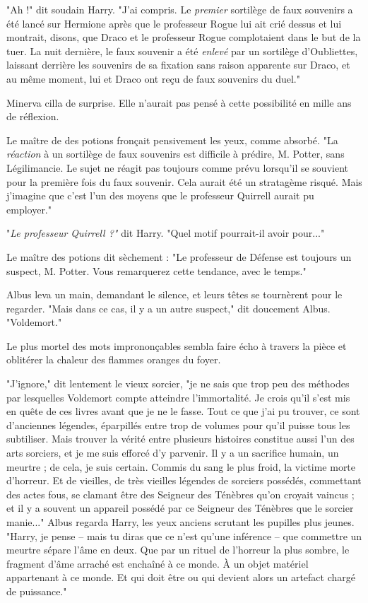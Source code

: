 "Ah !" dit soudain Harry. "J'ai compris. Le \emph{premier}  sortilège de faux souvenirs a été lancé sur Hermione après que le professeur Rogue lui ait crié dessus et lui montrait, disons, que Draco et le professeur Rogue complotaient dans le but de la tuer. La nuit dernière, le faux souvenir a été \emph{enlevé}  par un sortilège d'Oubliettes, laissant derrière les souvenirs de sa fixation sans raison apparente sur Draco, et au même moment, lui et Draco ont reçu de faux souvenirs du duel."

Minerva cilla de surprise. Elle n'aurait pas pensé à cette possibilité en mille ans de réflexion.

Le maître de des potions fronçait pensivement les yeux, comme absorbé. "La \emph{réaction}  à un sortilège de faux souvenirs est difficile à prédire, M. Potter, sans Légilimancie. Le sujet ne réagit pas toujours comme prévu lorsqu'il se souvient pour la première fois du faux souvenir. Cela aurait été un stratagème risqué. Mais j'imagine que c'est l'un des moyens que le professeur Quirrell aurait pu employer."

"\emph{Le professeur Quirrell ?"}  dit Harry. "Quel motif pourrait-il avoir pour..."

Le maître des potions dit sèchement : "Le professeur de Défense est toujours un suspect, M. Potter. Vous remarquerez cette tendance, avec le temps."

Albus leva un main, demandant le silence, et leurs têtes se tournèrent pour le regarder. "Mais dans ce cas, il y a un autre suspect," dit doucement Albus. "Voldemort."

Le plus mortel des mots imprononçables sembla faire écho à travers la pièce et oblitérer la chaleur des flammes oranges du foyer.

"J'ignore," dit lentement le vieux sorcier, "je ne sais que trop peu des méthodes par lesquelles Voldemort compte atteindre l'immortalité. Je crois qu'il s'est mis en quête de ces livres avant que je ne le fasse. Tout ce que j'ai pu trouver, ce sont d'anciennes légendes, éparpillés entre trop de volumes pour qu'il puisse tous les subtiliser. Mais trouver la vérité entre plusieurs histoires constitue aussi l'un des arts sorciers, et je me suis efforcé d'y parvenir. Il y a un sacrifice humain, un meurtre ; de cela, je suis certain. Commis du sang le plus froid, la victime morte d'horreur. Et de vieilles, de très vieilles légendes de sorciers possédés, commettant des actes fous, se clamant être des Seigneur des Ténèbres qu'on croyait vaincus ; et il y a souvent un appareil possédé par ce Seigneur des Ténèbres que le sorcier manie..." Albus regarda Harry, les yeux anciens scrutant les pupilles plus jeunes. "Harry, je pense – mais tu diras que ce n'est qu'une inférence – que commettre un meurtre sépare l'âme en deux. Que par un rituel de l'horreur la plus sombre, le fragment d'âme arraché est enchaîné à ce monde. À un objet matériel appartenant à ce monde. Et qui doit être ou qui devient alors un artefact chargé de puissance."

